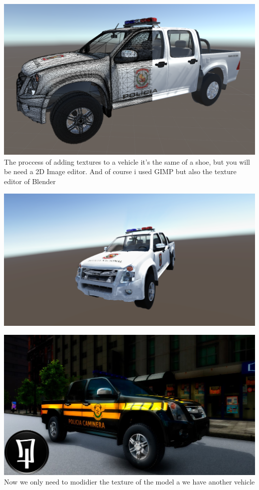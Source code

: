 \documentclass{article}
\begin{document}
  \includegraphics[width=\textwidth]{23.png}
  The proccess of adding textures to a vehicle it's the same of a shoe, but you will be need a 2D Image editor. And of course i used GIMP but also the texture editor of Blender

  \includegraphics[width=\textwidth]{24.png}
  
  \includegraphics[width=\textwidth]{37.jpg}
  Now we only need to modidier the texture of the model a we have another vehicle
  
\end{document}

